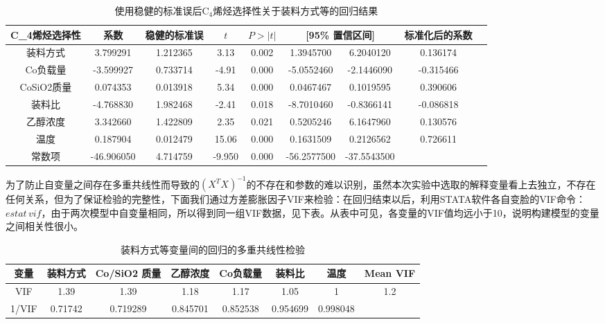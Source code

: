 \documentclass[a4paper,10.5pt]{ctexart}
\begin{document}
\begin{table}[htbp]
  \centering
  \caption{使用稳健的标准误后C$_4$烯烃选择性关于装料方式等的回归结果}
    \begin{tabular}{ccccccccc}
    \toprule[2pt]
    C_4烯烃选择性 &系数 & 稳健的标准误 &  $t$    & $P>|t|$ & \multicolumn{2}{c}{ [95\% 置信区间]} & 标准化后的系数 \\
    \midrule
    装料方式  & 3.799291  & 1.212365  & 3.13  & 0.002  & 1.3945700  & 6.2040120  & 0.136174  \\
     Co负载量 & -3.599927   & 0.733714  & -4.91  & 0.000  & -5.0552460  & -2.1446090  & -0.315466  \\
     CoSiO2质量  & 0.074353  & 0.013918  & 5.34  & 0.000  & 0.0467467  & 0.1019595  & 0.390606  \\
     装料比  & -4.768830   & 1.982468  & -2.41  & 0.018  & -8.7010460  & -0.8366141  & -0.086818  \\
     乙醇浓度  & 3.342660   & 1.422809  & 2.35  & 0.021  & 0.5205246  & 6.1647960  & 0.130576  \\
     温度   & 0.187904   & 0.012479  & 15.06  & 0.000  & 0.1631509  & 0.2126562  & 0.726611  \\
     常数项  & -46.906050  & 4.714759  & -9.950  & 0.000  & -56.2577500  & -37.5543500  &  \\
    \bottomrule[2pt]
    \end{tabular}%
  \label{tab:addlabel}%
\end{table}%

\par 为了防止自变量之间存在多重共线性而导致的$(X^{T}X)^{-1}$的不存在和参数的难以识别，虽然本次实验中选取的解释变量看上去独立，不存在任何关系，但为了保证检验的完整性，下面我们通过方差膨胀因子VIF来检验：在回归结束以后，利用STATA软件各自变脸的VIF命令：$estat\,vif$，由于两次模型中自变量相同，所以得到同一组VIF数据，见下表。从表中可见，各变量的VIF值均远小于10，说明构建模型的变量之间相关性很小。
\begin{table}[htbp]
  \centering
  \caption{装料方式等变量间的回归的多重共线性检验}
    \begin{tabular}{cccccccr}
    \toprule[2pt]
    变量    & 装料方式  & Co/SiO2 质量 & 乙醇浓度  & Co负载量 & 装料比   & 温度    & \multicolumn{1}{c}{Mean VIF} \\
    \midrule
    VIF   & 1.39  & 1.39  & 1.18  & 1.17  & 1.05  & 1     & \multicolumn{1}{c}{1.2} \\
    1/VIF & 0.71742 & 0.719289 & 0.845701 & 0.852538 & 0.954699 & 0.998048 &  \\
    \bottomrule[2pt]
    \end{tabular}%
  \label{tab:addlabel}%
\end{table}%
\end{document}
